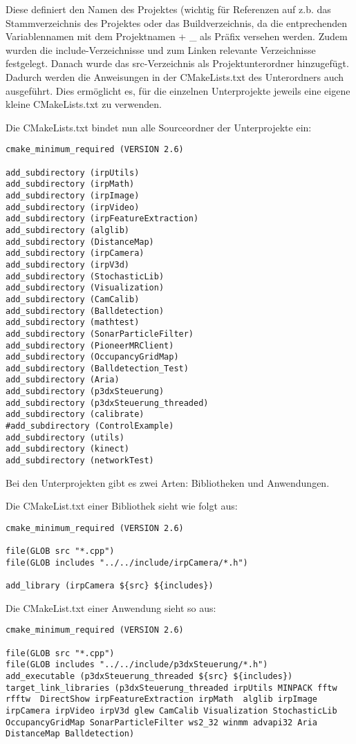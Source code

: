 Diese definiert den Namen des Projektes (wichtig
für Referenzen auf z.b. das Stammverzeichnis des Projektes oder das
Buildverzeichnis, da die entprechenden Variablennamen mit dem Projektnamen + \_
als Präfix versehen werden. Zudem wurden die include-Verzeichnisse und zum
Linken relevante Verzeichnisse festgelegt. Danach wurde das src-Verzeichnis als
Projektunterordner hinzugefügt. Dadurch werden die Anweisungen in der
CMakeLists.txt des Unterordners auch ausgeführt. Dies ermöglicht es, für die
einzelnen Unterprojekte jeweils eine eigene kleine CMakeLists.txt zu verwenden.

Die CMakeLists.txt bindet nun alle Sourceordner der Unterprojekte ein:

\begin{lstlisting}
cmake_minimum_required (VERSION 2.6)

add_subdirectory (irpUtils)
add_subdirectory (irpMath)
add_subdirectory (irpImage)
add_subdirectory (irpVideo)
add_subdirectory (irpFeatureExtraction)
add_subdirectory (alglib)
add_subdirectory (DistanceMap)
add_subdirectory (irpCamera)
add_subdirectory (irpV3d)
add_subdirectory (StochasticLib)
add_subdirectory (Visualization)
add_subdirectory (CamCalib)
add_subdirectory (Balldetection)
add_subdirectory (mathtest)
add_subdirectory (SonarParticleFilter)
add_subdirectory (PioneerMRClient)
add_subdirectory (OccupancyGridMap)
add_subdirectory (Balldetection_Test)
add_subdirectory (Aria)
add_subdirectory (p3dxSteuerung)
add_subdirectory (p3dxSteuerung_threaded)
add_subdirectory (calibrate)
#add_subdirectory (ControlExample)
add_subdirectory (utils)
add_subdirectory (kinect)
add_subdirectory (networkTest)
\end{lstlisting}

Bei den Unterprojekten gibt es zwei Arten: Bibliotheken und Anwendungen.

Die CMakeList.txt einer Bibliothek sieht wie folgt aus:

\begin{lstlisting}
cmake_minimum_required (VERSION 2.6) 

file(GLOB src "*.cpp")
file(GLOB includes "../../include/irpCamera/*.h")

add_library (irpCamera ${src} ${includes})
\end{lstlisting}

Die CMakeList.txt einer Anwendung sieht so aus:
\begin{lstlisting}
cmake_minimum_required (VERSION 2.6) 

file(GLOB src "*.cpp")
file(GLOB includes "../../include/p3dxSteuerung/*.h")
add_executable (p3dxSteuerung_threaded ${src} ${includes})
target_link_libraries (p3dxSteuerung_threaded irpUtils MINPACK fftw rfftw  DirectShow irpFeatureExtraction irpMath  alglib irpImage irpCamera irpVideo irpV3d glew CamCalib Visualization StochasticLib OccupancyGridMap SonarParticleFilter ws2_32 winmm advapi32 Aria DistanceMap Balldetection)

\end{lstlisting}

